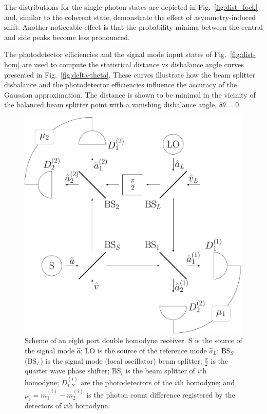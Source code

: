 \documentclass[%
reprint,
superscriptaddress,
 amsmath,amssymb,amsfonts,
 aps,
 pra,
 longbibliography
]{revtex4-2}
\begin{document}
The distributions for the single-photon states
are depicted in Fig.~\ref{fig:dist_fock}
and, similar to the coherent state,
demonstrate the effect of asymmetry-induced shift.
Another noticeable effect is that
the probability minima between the central and side peaks
become less pronounced.

The photodetector efficiencies
and the signal mode input states
of Fig.~\ref{fig:dist-hom}
are used to compute
the statistical distance vs disbalance angle
curves presented in Fig.~\ref{fig:delta-theta}.
These curves illustrate how the beam splitter disbalance and
the photodetector efficiencies influence the accuracy of the
Gaussian approximation.
The distance is shown to be minimal in the vicinity of
the balanced beam splitter point with
a vanishing disbalance angle, $\delta\theta=0$.

  

\begin{figure}
    \centering
    \includegraphics[width=0.9\linewidth]{pics/schemes/double_homodyne.pdf}
    \caption{Scheme of an eight port double homodyne receiver.
      S is the source of the signal mode
      $\hat{a}$; LO is the source of the reference mode $\hat{a}_{L}$;
      BS$_S$ (BS$_L$) is the signal mode (local oscillator) beam splitter;
      $\frac{\pi}{2}$ is the quarter wave phase shifter;
BS$_i$ is the beam splitter of $i$th homodyne;
$D_{1,2}^{(i)}$ are the photodetectors of the $i$th homodyne;
and $\mu_i=m_1^{(i)}-m_2^{(i)}$ is the photon count difference registered by
the detectors of $i$th homodyne.
    }
    \label{fig:double-homodyne}
\end{figure}
\end{document}
